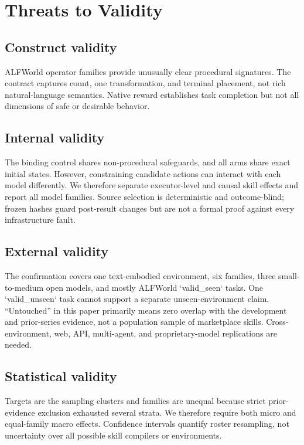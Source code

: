 \documentclass[pdflatex,sn-mathphys-num]{sn-jnl}
\begin{document}
\section{Threats to Validity}
\subsection{Construct validity}
ALFWorld operator families provide unusually clear procedural signatures. The
contract captures count, one transformation, and terminal placement, not rich
natural-language semantics. Native reward establishes task completion but not
all dimensions of safe or desirable behavior.

\subsection{Internal validity}
The binding control shares non-procedural safeguards, and all arms share exact
initial states. However, constraining candidate actions can interact with each
model differently. We therefore separate executor-level and causal skill
effects and report all model families. Source selection is deterministic and
outcome-blind; frozen hashes guard post-result changes but are not a formal proof
against every infrastructure fault.

\subsection{External validity}
The confirmation covers one text-embodied environment, six families, three
small-to-medium open models, and mostly ALFWorld `valid\_seen` tasks. One
`valid\_unseen` task cannot support a separate unseen-environment claim.
``Untouched'' in this paper primarily means zero overlap with the development
and prior-series evidence, not a population sample of marketplace skills.
Cross-environment, web, API, multi-agent, and proprietary-model replications are
needed.

\subsection{Statistical validity}
Targets are the sampling clusters and families are unequal because strict prior-
evidence exclusion exhausted several strata. We therefore require both micro
and equal-family macro effects. Confidence intervals quantify roster
resampling, not uncertainty over all possible skill compilers or environments.
\end{document}
